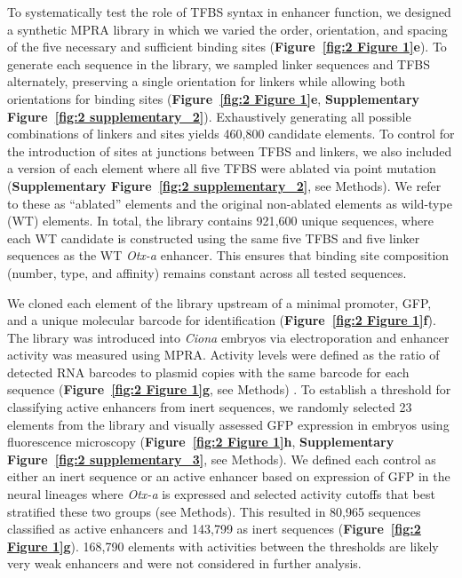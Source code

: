 To systematically test the role of TFBS syntax in enhancer function, we designed a synthetic MPRA library in which we varied the order, orientation, and spacing of the five necessary and sufficient binding sites (\textbf{Figure~\ref{fig:2 Figure 1}e}). To generate each sequence in the library, we sampled linker sequences and TFBS alternately, preserving a single orientation for linkers while allowing both orientations for binding sites (\textbf{Figure~\ref{fig:2 Figure 1}e}, \textbf{Supplementary Figure~\ref{fig:2 supplementary_2}}). Exhaustively generating all possible combinations of linkers and sites yields 460{,}800 candidate elements. To control for the introduction of sites at junctions between TFBS and linkers, we also included a version of each element where all five TFBS were ablated via point mutation (\textbf{Supplementary Figure~\ref{fig:2 supplementary_2}}, see Methods). We refer to these as “ablated” elements and the original non-ablated elements as wild-type (WT) elements. In total, the library contains 921{,}600 unique sequences, where each WT candidate is constructed using the same five TFBS and five linker sequences as the WT \textit{Otx-a} enhancer. This ensures that binding site composition (number, type, and affinity) remains constant across all tested sequences.

We cloned each element of the library upstream of a minimal promoter, GFP, and a unique molecular barcode for identification (\textbf{Figure~\ref{fig:2 Figure 1}f}). The library was introduced into \textit{Ciona} embryos via electroporation and enhancer activity was measured using MPRA. Activity levels were defined as the ratio of detected RNA barcodes to plasmid copies with the same barcode for each sequence (\textbf{Figure~\ref{fig:2 Figure 1}g}, see Methods) \cite{Ashuach2019-qp}. To establish a threshold for classifying active enhancers from inert sequences, we randomly selected 23 elements from the library and visually assessed GFP expression in embryos using fluorescence microscopy (\textbf{Figure~\ref{fig:2 Figure 1}h}, \textbf{Supplementary Figure~\ref{fig:2 supplementary_3}}, see Methods). We defined each control as either an inert sequence or an active enhancer based on expression of GFP in the neural lineages where \textit{Otx-a} is expressed and selected activity cutoffs that best stratified these two groups (see Methods). This resulted in 80{,}965 sequences classified as active enhancers and 143{,}799 as inert sequences (\textbf{Figure~\ref{fig:2 Figure 1}g}). 168{,}790 elements with activities between the thresholds are likely very weak enhancers and were not considered in further analysis.

